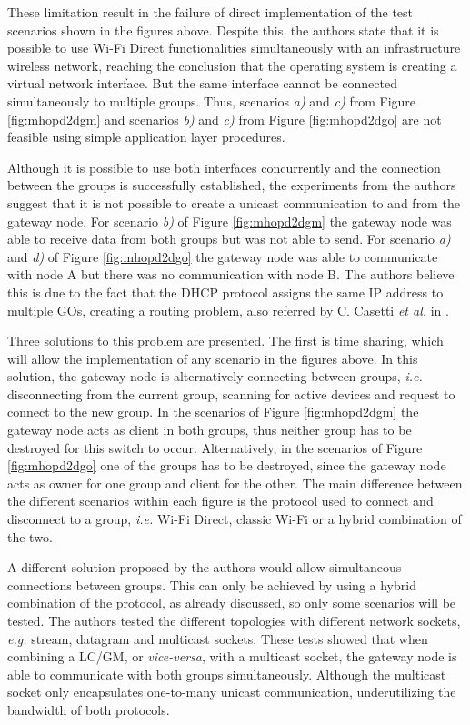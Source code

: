 These limitation result in the failure of direct implementation of the test scenarios shown in the figures above. Despite this, the authors state that it is possible to use Wi-Fi Direct functionalities simultaneously with an infrastructure wireless network, reaching the conclusion that the operating system is creating a virtual network interface. But the same interface cannot be connected simultaneously to multiple groups. Thus, scenarios \textit{a)} and \textit{c)} from Figure \ref{fig:mhopd2dgm} and scenarios \textit{b)} and \textit{c)} from Figure \ref{fig:mhopd2dgo} are not feasible using simple application layer procedures.

Although it is possible to use both interfaces concurrently and the connection between the groups is successfully established, the experiments from the authors suggest that it is not possible to create a unicast communication to and from the gateway node. For scenario \textit{b)} of Figure \ref{fig:mhopd2dgm} the gateway node was able to receive data from both groups but was not able to send. For scenario \textit{a)} and \textit{d)} of Figure \ref{fig:mhopd2dgo} the gateway node was able to communicate with node A but there was no communication with node B. The authors believe this is due to the fact that the \gls{DHCP} protocol assigns the same \gls{IP} address to multiple \glspl{GO}, creating a routing problem, also referred by C. Casetti \textit{et al.} in \cite{routeMultiGroup}.

Three solutions to this problem are presented. The first is time sharing, which will allow the implementation of any scenario in the figures above. In this solution, the gateway node is alternatively connecting between groups, \textit{i.e.} disconnecting from the current group, scanning for active devices and request to connect to the new group. In the scenarios of Figure \ref{fig:mhopd2dgm} the gateway node acts as client in both groups, thus neither group has to be destroyed for this switch to occur. Alternatively, in the scenarios of Figure \ref{fig:mhopd2dgo} one of the groups has to be destroyed, since the gateway node acts as owner for one group and client for the other. The main difference between the different scenarios within each figure is the protocol used to connect and disconnect to a group, \textit{i.e.} Wi-Fi Direct, classic Wi-Fi or a hybrid combination of the two.

A different solution proposed by the authors would allow simultaneous connections between groups. This can only be achieved by using a hybrid combination of the protocol, as already discussed, so only some scenarios will be tested. The authors tested the different topologies with different network sockets, \textit{e.g.} stream, datagram and multicast sockets. These tests showed that when combining a LC/GM, or \textit{vice-versa}, with a multicast socket, the gateway node is able to communicate with both groups simultaneously. Although the multicast socket only encapsulates one-to-many unicast communication, underutilizing the bandwidth of both protocols.

